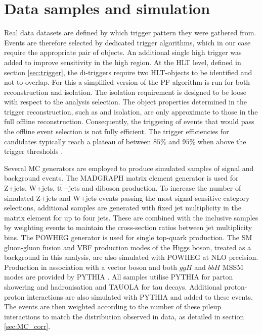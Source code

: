 \section{Data samples and simulation}
\label{sec:analysis_samples}

Real data datasets are defined by which trigger pattern they were gathered from. Events are therefore selected by dedicated trigger algorithms, which in our case require the appropriate pair of \tauh objects. An additional single high \pt \tauh trigger was added to improve sensitivity in the high \pt region. At the HLT level, defined in section \ref{sec:trigger}, the di-\tauh triggers require two HLT-\tauh objects to be identified and not to overlap. For this a simplified version of the PF algorithm is run for both \tauh reconstruction and isolation. The isolation requirement is designed to be loose with respect to the analysis selection. The object properties determined in the trigger reconstruction, such as \pt and isolation, are only approximate to those in the full offline reconstruction. Consequently, the triggering of events that would pass the offline event selection is not fully efficient. The trigger efficiencies for \tauh candidates typically reach a plateau of between $85\%$ and $95\%$ when above the trigger \pt thresholds \cite{Sirunyan_2018}.

Several MC generators are employed to produce simulated samples of signal and background events. The MADGRAPH \cite{Alwall2011} matrix element generator is used for Z+jets, W+jets, $\mathrm{t\Bar{t}}$+jets and diboson production. To increase the number of simulated Z+jets and W+jets events passing the most signal-sensitive category selections, additional samples are generated with fixed jet multiplicity in the matrix element for up to four jets. These are combined with the inclusive samples by weighting events to maintain the cross-section ratios between jet multiplicity bins. The POWHEG \cite{Alioli2010} generator is used for single top-quark production. The SM gluon-gluon fusion and VBF production modes of the Higgs boson, treated as a background in this analysis, are also simulated with POWHEG at NLO precision. Production in association with a vector boson and both $ggH$ and $bbH$ MSSM modes are provided by PYTHIA \cite{SJOSTRAND2008852}. All samples utilise PYTHIA for parton showering and hadronisation and TAUOLA \cite{JADACH1991275} for tau decays. Additional proton-proton interactions are also simulated with PYTHIA and added to these events. The events are then weighted according to the number of these pileup interactions to match the distribution observed in data, as detailed in section \ref{sec:MC_corr}. 


